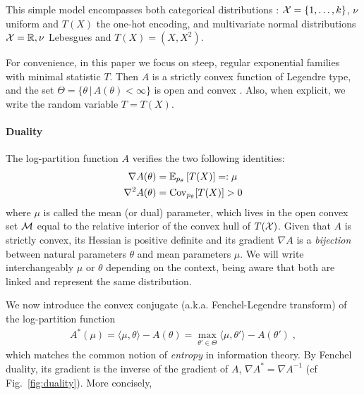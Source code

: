 \documentclass[twoside]{article}
\newcommand*{\expect}[2][]{\ensuremath{\mathbb{E}_{#1} \left[ #2 \right] }} %
\newcommand{\cond}{\,\vert\,}
\newcommand{\logpart}{A}
\newcommand{\conj}{\logpart^*}
\newcommand{\nat}{\theta}
\newcommand{\m}{\mu}
\newcommand{\meanp}{\m}
\begin{document}
This simple model encompasses both categorical distributions : ${\mathcal X} = \{1, \dots, k\}$, $\nu$ uniform and $T(X)$  the one-hot encoding, and multivariate normal distributions ${\mathcal X}=\mathbb{R}, \nu$ Lebesgues and $T(X)=(X, X^2)$.

For convenience, in this paper we focus on steep, regular exponential families with minimal statistic $T$.
Then $\logpart$ is a strictly convex function of Legendre type,
and the set $\Theta = \{ \nat \cond \logpart(\nat) < \infty\}$ is open and convex
\citep{barndoffnielsen2014information}. 
Also, when explicit, we write the random variable $T = T(X)$.


\paragraph{Duality}
The log-partition function $\logpart$ verifies the two following identities:
\begin{align}
    \nabla\logpart(\nat) &=  \expect[p_\nat]{T(X)} =: \meanp \\
    \nabla^2 \logpart(\nat) &= \Cov_{p_\nat}[T(X)] > 0
\end{align}
where $\meanp$ is called the mean (or dual) parameter, which lives in the open convex set ${\mathcal M}$ equal to the relative interior of the convex hull of $T({\mathcal X})$.
Given that $\logpart$ is strictly convex, its Hessian is positive definite and its gradient $\nabla \logpart$ is a \textit{bijection} between natural parameters $\nat$ and mean parameters $\m$.
We will write interchangeably $\m$ or  $\nat$ depending on the context, being aware that both are linked and represent the same distribution.

We now introduce the convex conjugate (a.k.a. Fenchel-Legendre transform) of the log-partition function
\begin{align}
	\conj(\m) =  \langle \m, \nat \rangle - \logpart(\nat)
	=  \max_{\nat'\in\Theta}  \langle \m, \nat' \rangle - \logpart(\nat')\; ,
\end{align}
which matches the common notion of \textit{entropy} in information theory.
By Fenchel duality, its gradient is the inverse of the gradient of $\logpart$,  $\nabla\conj=\nabla\logpart^{-1}$ (cf Fig.~\ref{fig:duality}). More concisely,
\aligns{
	\nabla\conj \circ \nabla\logpart(\nat) = \nat, \quad \nabla\logpart\circ \nabla\conj(\meanp) = \meanp.
}
\end{document}

